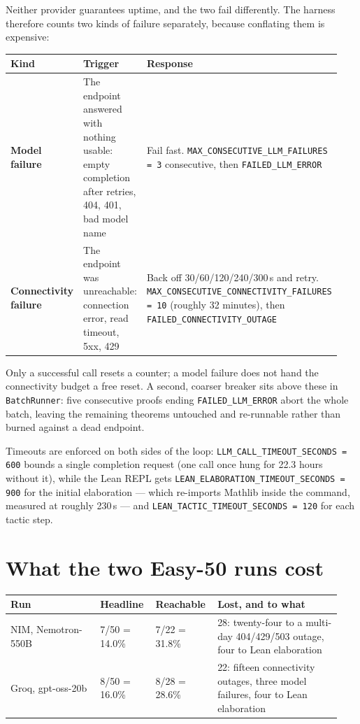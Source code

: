Neither provider guarantees uptime, and the two fail differently. The harness
therefore counts two kinds of failure separately, because conflating them is
expensive:

\begin{center}
\begin{tabular}{@{}p{0.20\linewidth}p{0.40\linewidth}p{0.34\linewidth}@{}}
\hline
\textbf{Kind} & \textbf{Trigger} & \textbf{Response} \\
\hline
\textbf{Model failure} & The endpoint answered with nothing usable: empty
completion after retries, 404, 401, bad model name & Fail fast.
\texttt{MAX\_CONSECUTIVE\_LLM\_FAILURES = 3} consecutive, then
\texttt{FAILED\_LLM\_ERROR} \\
\textbf{Connectivity failure} & The endpoint was unreachable: connection
error, read timeout, 5xx, 429 & Back off 30/60/120/240/300\,s and retry.
\texttt{MAX\_CONSECUTIVE\_CONNECTIVITY\_FAILURES = 10} (roughly 32 minutes),
then \texttt{FAILED\_CONNECTIVITY\_OUTAGE} \\
\hline
\end{tabular}
\end{center}

Only a successful call resets a counter; a model failure does not hand the
connectivity budget a free reset. A second, coarser breaker sits above these
in \texttt{BatchRunner}: five consecutive proofs ending
\texttt{FAILED\_LLM\_ERROR} abort the whole batch, leaving the remaining
theorems untouched and re-runnable rather than burned against a dead endpoint.

Timeouts are enforced on both sides of the loop:
\texttt{LLM\_CALL\_TIMEOUT\_SECONDS = 600} bounds a single completion request
(one call once hung for 22.3 hours without it), while the Lean REPL gets
\texttt{LEAN\_ELABORATION\_TIMEOUT\_SECONDS = 900} for the initial
elaboration --- which re-imports Mathlib inside the command, measured at
roughly 230\,s --- and \texttt{LEAN\_TACTIC\_TIMEOUT\_SECONDS = 120} for each
tactic step.

\section{What the two Easy-50 runs cost}

\begin{center}
\begin{tabular}{@{}p{0.26\linewidth}p{0.16\linewidth}p{0.16\linewidth}p{0.36\linewidth}@{}}
\hline
\textbf{Run} & \textbf{Headline} & \textbf{Reachable} & \textbf{Lost, and to what} \\
\hline
NIM, Nemotron-550B & 7/50 = 14.0\% & 7/22 = 31.8\% & 28: twenty-four to a
multi-day 404/429/503 outage, four to Lean elaboration \\
Groq, gpt-oss-20b & 8/50 = 16.0\% & 8/28 = 28.6\% & 22: fifteen connectivity
outages, three model failures, four to Lean elaboration \\
\hline
\end{tabular}
\end{center}

